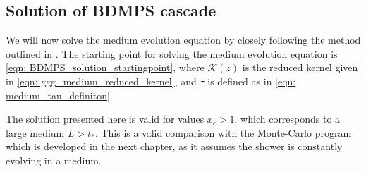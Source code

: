 \documentclass[main.tex]{subfiles}
\begin{document}
\subsection{Solution of BDMPS cascade }
We will now solve the medium evolution equation by closely following the method outlined in \cite{Energy_flow_medium_cascade_2016}.
The starting point for solving the medium evolution equation is \autoref{eqn: BDMPS_solution_startingpoint}, where \(\mathcal{K}(z)\) is the reduced kernel given in \autoref{eqn: ggg_medium_reduced_kernel}, and \(\tau \) is defined as in \autoref{eqn: medium_tau_definiton}.

The solution presented here is valid for values \(x_c > 1\), which corresponds to a large medium \(L>t_*\). This is a valid comparison with the Monte-Carlo program which is developed in the next chapter, as it assumes the shower is constantly evolving in a medium. 
\end{document}
